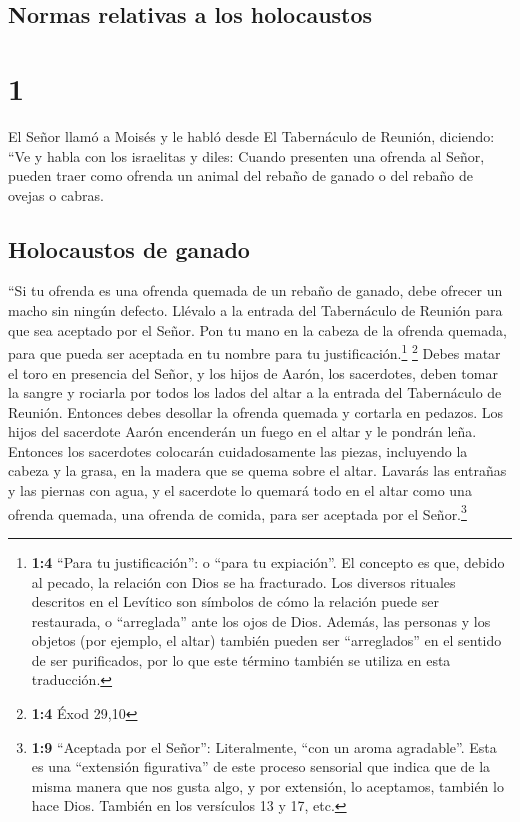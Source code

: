 \hypertarget{normas-relativas-a-los-holocaustos}{%
\subsection{Normas relativas a los
holocaustos}\label{normas-relativas-a-los-holocaustos}}

\hypertarget{section}{%
\section{1}\label{section}}

 El Señor llamó a Moisés y le habló desde El Tabernáculo
de Reunión, diciendo:  ``Ve y habla con los israelitas y
diles: Cuando presenten una ofrenda al Señor, pueden traer como ofrenda
un animal del rebaño de ganado o del rebaño de ovejas o cabras.

\hypertarget{holocaustos-de-ganado}{%
\subsection{Holocaustos de ganado}\label{holocaustos-de-ganado}}

 ``Si tu ofrenda es una ofrenda quemada de un rebaño de
ganado, debe ofrecer un macho sin ningún defecto. Llévalo a la entrada
del Tabernáculo de Reunión para que sea aceptado por el Señor.
 Pon tu mano en la cabeza de la ofrenda quemada, para que
pueda ser aceptada en tu nombre para tu justificación.\footnote{\textbf{1:4}
  ``Para tu justificación'': o ``para tu expiación''. El concepto es
  que, debido al pecado, la relación con Dios se ha fracturado. Los
  diversos rituales descritos en el Levítico son símbolos de cómo la
  relación puede ser restaurada, o ``arreglada'' ante los ojos de Dios.
  Además, las personas y los objetos (por ejemplo, el altar) también
  pueden ser ``arreglados'' en el sentido de ser purificados, por lo que
  este término también se utiliza en esta traducción.} \footnote{\textbf{1:4}
  Éxod 29,10}  Debes matar el toro en presencia del Señor,
y los hijos de Aarón, los sacerdotes, deben tomar la sangre y rociarla
por todos los lados del altar a la entrada del Tabernáculo de Reunión.
 Entonces debes desollar la ofrenda quemada y cortarla en
pedazos.  Los hijos del sacerdote Aarón encenderán un
fuego en el altar y le pondrán leña.  Entonces los
sacerdotes colocarán cuidadosamente las piezas, incluyendo la cabeza y
la grasa, en la madera que se quema sobre el altar. 
Lavarás las entrañas y las piernas con agua, y el sacerdote lo quemará
todo en el altar como una ofrenda quemada, una ofrenda de comida, para
ser aceptada por el Señor.\footnote{\textbf{1:9} ``Aceptada por el
  Señor'': Literalmente, ``con un aroma agradable''. Esta es una
  ``extensión figurativa'' de este proceso sensorial que indica que de
  la misma manera que nos gusta algo, y por extensión, lo aceptamos,
  también lo hace Dios. También en los versículos 13 y 17, etc.}


